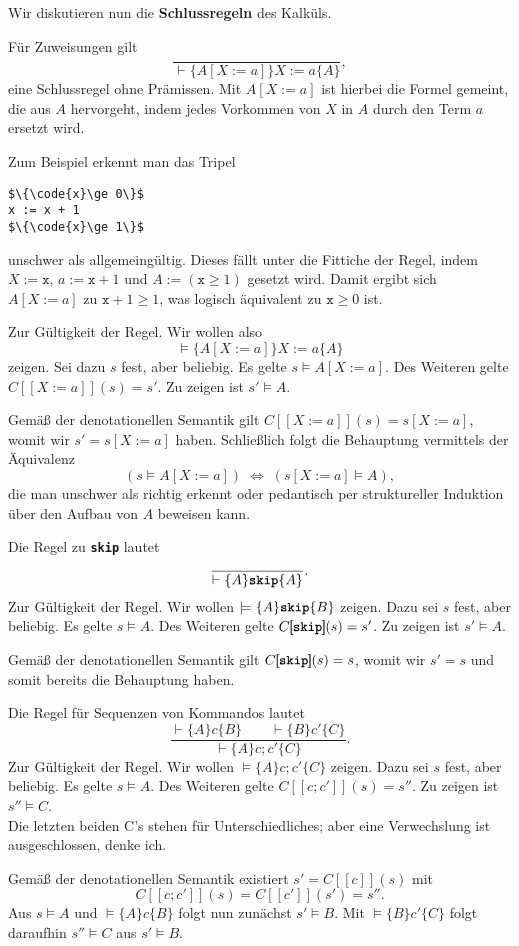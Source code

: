 \documentclass[8pt,fleqn,aspectratio=169]{beamer}
\newcommand{\strong}[1]{\textsf{\textbf{#1}}}
\newcommand{\parspace}{\vspace{0.8em}}
\newcommand{\kw}[1]{\textbf{\texttt{#1}}}
\newcommand{\code}[1]{\texttt{#1}}
\newcommand{\qb}[1]{[\!\![#1]\!\!]}
\begin{document}
\begin{frame}[fragile]
Wir diskutieren nun die \strong{Schlussregeln} des Kalküls.\pause

\parspace
Für Zuweisungen gilt
\[\dfrac{}{\vdash\{A[X:=a]\}X:=a\{A\}},\]
eine Schlussregel ohne Prämissen. Mit $A[X:=a]$ ist hierbei die
Formel gemeint, die aus $A$ hervorgeht, indem jedes Vorkommen von
$X$ in $A$ durch den Term $a$ ersetzt wird.\pause

\parspace
Zum Beispiel erkennt man das Tripel
\begin{lstlisting}[language=IMP, xleftmargin=\mathindent, mathescape]
$\{\code{x}\ge 0\}$
x := x + 1
$\{\code{x}\ge 1\}$
\end{lstlisting}
unschwer als allgemeingültig. Dieses fällt unter die Fittiche der
Regel, indem $X:=\code{x}$, $a:=\code{x}+1$ und $A:=(\code{x}\ge 1)$
gesetzt wird. Damit ergibt sich $A[X:=a]$ zu $\code{x} + 1\ge 1$,
was logisch äquivalent zu $\code{x}\ge 0$ ist.
\end{frame}

\begin{frame}
Zur Gültigkeit der Regel. Wir wollen also
\[\models\{A[X:=a]\}X:=a\{A\}\]
zeigen.\pause{} Sei dazu $s$ fest, aber beliebig. Es gelte $s\models A[X:=a]$.
Des Weiteren gelte $C\qb{X:=a}(s)=s'$. Zu zeigen ist $s'\models A$.\pause

\parspace
Gemäß der denotationellen Semantik gilt $C\qb{X:=a}(s)=s[X:=a]$, womit
wir $s'=s[X:=a]$ haben. Schließlich folgt die Behauptung vermittels
der Äquivalenz
\[(s\models A[X:=a])\;\Leftrightarrow\; (s[X:=a]\models A),\]
die man unschwer als richtig erkennt oder pedantisch per struktureller
Induktion über den Aufbau von $A$ beweisen kann.
\end{frame}

\begin{frame}
Die Regel zu \kw{skip} lautet
\[\dfrac{}{\vdash\{A\}\kw{skip}\{A\}}.\]\pause
Zur Gültigkeit der Regel. Wir wollen $\models\{A\}\kw{skip}\{B\}$ zeigen.
Dazu sei $s$ fest, aber beliebig. Es gelte $s\models A$. Des Weiteren
gelte $C\qb{\kw{skip}}(s)=s'$. Zu zeigen ist $s'\models A$.\pause

\parspace
Gemäß der denotationellen Semantik gilt $C\qb{\kw{skip}}(s)=s$, womit
wir $s'=s$ und somit bereits die Behauptung haben.
\end{frame}

\begin{frame}
Die Regel für Sequenzen von Kommandos lautet
\[\dfrac{\vdash\{A\}c\{B\}\qquad \vdash\{B\}c'\{C\}}{\vdash\{A\}c; c'\{C\}}.\]\pause
Zur Gültigkeit der Regel. Wir wollen $\models\{A\} c; c'\{C\}$ zeigen.
Dazu sei $s$ fest, aber beliebig. Es gelte $s\models A$. Des Weiteren
gelte $C\qb{c;c'}(s)=s''$. Zu zeigen ist $s''\models C$.\\
{\footnotesize Die letzten beiden C's stehen für Unterschiedliches; aber eine
Verwechslung ist ausgeschlossen, denke ich.}\pause

\parspace
Gemäß der denotationellen Semantik existiert $s'=C\qb{c}(s)$ mit
\[C\qb{c;c'}(s) = C\qb{c'}(s')=s''.\]
Aus $s\models A$ und $\models\{A\}c\{B\}$ folgt nun zunächst $s'\models B$.
Mit $\models\{B\}c'\{C\}$ folgt daraufhin $s''\models C$ aus $s'\models B$.
\end{frame}
\end{document}
